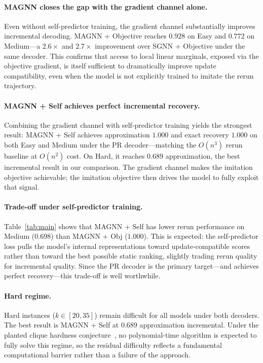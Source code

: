 \documentclass[11pt]{article}
\newcommand{\change}[1]{{\color{red}#1}}
\theoremstyle{plain}
\theoremstyle{definition}
\theoremstyle{remark}
\begin{document}
\paragraph{MAGNN closes the gap with the gradient channel alone.}
Even without self-predictor training, the gradient channel substantially improves
incremental decoding. MAGNN + Objective reaches $0.928$ on Easy and $0.772$ on
Medium---a $2.6\times$ and $2.7\times$ improvement over SGNN + Objective under the
same decoder. This confirms that access to local linear marginals, exposed via the
objective gradient, is itself sufficient to dramatically improve update compatibility,
even when the model is not explicitly trained to imitate the rerun trajectory.

\paragraph{MAGNN + Self achieves perfect incremental recovery.}
Combining the gradient channel with self-predictor training yields the strongest
result: MAGNN + Self achieves approximation $1.000$ and exact recovery $1.000$ on
both Easy and Medium under the \change{PR} decoder---matching the $O(n^3)$ rerun
baseline at $O(n^2)$ cost. On Hard, it reaches $0.689$ approximation, the best
incremental result in our comparison. The gradient channel makes the imitation
objective achievable; the imitation objective then drives the model to fully exploit
that signal.

\paragraph{Trade-off under self-predictor training.}
Table~\ref{tab:main} shows that MAGNN + Self has lower rerun performance on Medium
($0.698$) than MAGNN + Obj ($1.000$). This is expected: the self-predictor loss
pulls the model's internal representations toward update-compatible scores rather
than toward the best possible static ranking, slightly trading rerun quality for
incremental quality. Since the \change{PR} decoder is the primary target---and
achieves perfect recovery---this trade-off is well worthwhile.

\paragraph{Hard regime.}
Hard instances ($k \in [20, 35]$) remain difficult for all models under both
decoders. The best result is MAGNN + Self at $0.689$ approximation incremental.
Under the planted clique hardness conjecture~\citep{manurangsi2021}, no
polynomial-time algorithm is expected to fully solve this regime, so the residual
difficulty reflects a fundamental computational barrier rather than a failure of the
approach.
\end{document}
